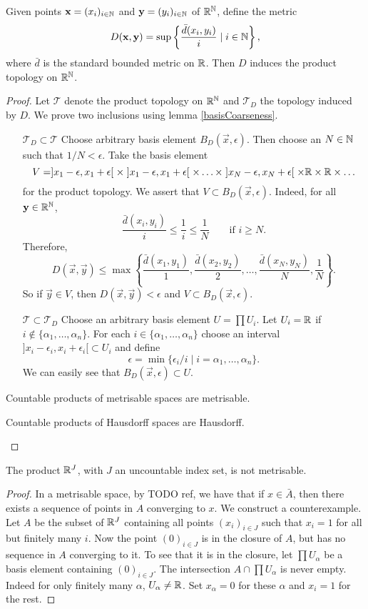\begin{lemma}
Given points $\boldsymbol{\mathrm{x}}=(x_i)_{i\in \mathbb{N}}$ and $\boldsymbol{\mathrm{y}}=(y_i)_{i\in \mathbb{N}}$ of $\mathbb{R}^{\mathbb{N}}$, define the metric
\[ D(\boldsymbol{\mathrm{x}}, \boldsymbol{\mathrm{y}}) = \sup\left\{\frac{\bar{d}(x_i,y_i)}{i}\;|\; i\in \mathbb{N}\right\}, \]
where $\bar{d}$ is the standard bounded metric on $\mathbb{R}$. Then $D$ induces the product topology on $\mathbb{R}^{\mathbb{N}}$.
\end{lemma}
\begin{proof}
Let $\mathcal{T}$ denote the product topology on $\mathbb{R}^{\mathbb{N}}$ and $\mathcal{T}_D$ the topology induced by $D$. We prove two inclusions using lemma \ref{basisCoarseness}.
\begin{itemize}[leftmargin=2cm]
\item[$\boxed{\mathcal{T}_D\subset\mathcal{T}}$] Choose arbitrary basis element $B_D(\vec{x},\epsilon)$. Then choose an $N\in\mathbb{N}$ such that $1/N<\epsilon$. Take the basis element
\[ V = ]x_1-\epsilon,x_1+\epsilon[\;\times\;]x_1-\epsilon,x_1+\epsilon[\;\times \ldots\times\; ]x_N-\epsilon, x_N+\epsilon[\;\times \mathbb{R}\times\mathbb{R}\times \ldots \]
for the product topology. We assert that $V\subset B_D(\vec{x},\epsilon)$. Indeed, for all $\boldsymbol{\mathrm{y}}\in\mathbb{R}^{\mathbb{N}}$,
\[ \frac{\bar{d}(x_i,y_i)}{i} \leq \frac{1}{i} \leq \frac{1}{N} \qquad \text{if $i\geq N$}. \]
Therefore,
\[ D(\vec{x},\vec{y}) \leq \max\left\{ \frac{\bar{d}(x_1,y_1)}{1},\frac{\bar{d}(x_2,y_2)}{2},\ldots, \frac{\bar{d}(x_N,y_N)}{N}, \frac{1}{N} \right\}. \]
So if $\vec{y}\in V$, then $D(\vec{x},\vec{y})< \epsilon$ and $V\subset B_D(\vec{x},\epsilon)$.
\item[$\boxed{\mathcal{T}\subset\mathcal{T}_D}$] Choose an arbitrary basis element $U = \prod U_i$. Let $U_i=\mathbb{R}$ if $i\notin \{\alpha_1,\ldots, \alpha_n\}$. For each $i\in \{\alpha_1,\ldots, \alpha_n\}$ choose an interval $]x_i-\epsilon_i,x_i+\epsilon_i[\subset U_i$ and define
\[ \epsilon = \min\{\epsilon_i/i\;|\;i=\alpha_1,\ldots, \alpha_n\}. \]
We can easily see that $B_D(\vec{x},\epsilon) \subset U$.
\end{itemize}
\begin{corollary}
Countable products of metrisable spaces are metrisable.
\end{corollary}
\begin{corollary}
Countable products of Hausdorff spaces are Hausdorff.
\end{corollary}
\end{proof}
\begin{lemma}
The product $\mathbb{R}^J$, with $J$ an uncountable index set, is not metrisable.
\end{lemma}
\begin{proof}
In a metrisable space, by TODO ref, we have that if $x\in \bar{A}$, then there exists a sequence of points in $A$ converging to $x$. We construct a counterexample. Let $A$ be the subset of $\mathbb{R}^J$ containing all points $(x_i)_{i\in J}$ such that $x_i=1$ for all but finitely many $i$. Now the point $(0)_{i\in J}$ is in the closure of $A$, but has no sequence in $A$ converging to it. To see that it is in the closure, let $\prod U_\alpha$ be a basis element containing $(0)_{i\in J}$. The intersection $A\cap \prod U_\alpha$ is never empty. Indeed for only finitely many $\alpha$, $U_\alpha\neq \mathbb{R}$. Set $x_\alpha = 0$ for these $\alpha$ and $x_i = 1$ for the rest.
\end{proof}

